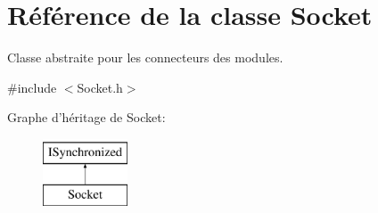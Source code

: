 \hypertarget{classSocket}{\section{Référence de la classe Socket}
\label{classSocket}
}


Classe abstraite pour les connecteurs des modules.  




{\ttfamily \#include $<$Socket.\-h$>$}

Graphe d'héritage de Socket\-:\begin{figure}[H]
\begin{center}
\leavevmode
\includegraphics[height=2.000000cm]{classSocket}
\end{center}
\end{figure}
